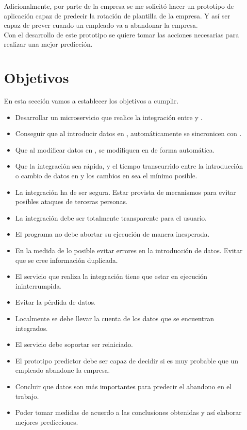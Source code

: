 Adicionalmente, por parte de la empresa se me solicitó hacer un prototipo de aplicación capaz de predecir la rotación de plantilla de la empresa.
Y así ser capaz de prever cuando un empleado va a abandonar la empresa. \\

Con el desarrollo de este prototipo se quiere tomar las acciones necesarias para realizar una mejor predicción.



\section{Objetivos}

En esta sección vamos a establecer los objetivos a cumplir.

\begin{itemize}
	\item Desarrollar un microservicio que realice la integración entre \hs{} y \wday{}.
	\item Conseguir que al introducir datos en \hs{}, automáticamente se sincronicen con \wday{}.
	\item Que al modificar datos en \hs{}, se modifiquen en \wday{} de forma automática.
	\item Que la integración sea rápida, y el tiempo transcurrido entre la introducción o cambio de datos en \hs{} y los cambios en \wday{} sea el mínimo posible.
	\item La integración ha de ser segura. Estar provista de mecanismos para evitar posibles ataques de terceras personas.
	\item La integración debe ser totalmente transparente para el usuario. 
	\item El programa no debe abortar su ejecución de manera inesperada.
	\item En la medida de lo posible evitar errores en la introducción de datos. Evitar que se cree información duplicada.
	\item El servicio que realiza la integración tiene que estar en ejecución ininterrumpida.
	\item Evitar la pérdida de datos.
	\item Localmente se debe llevar la cuenta de los datos que se encuentran integrados.
	\item El servicio debe soportar ser reiniciado.
	\item El prototipo predictor debe ser capaz de decidir si es muy probable que un empleado abandone la empresa.
	\item Concluir que datos son más importantes para predecir el abandono en el trabajo.
	\item Poder tomar medidas de acuerdo a las conclusiones obtenidas y así elaborar mejores predicciones.
\end{itemize}


